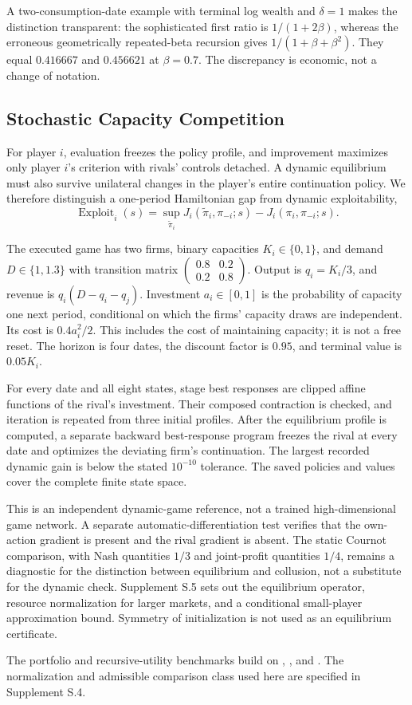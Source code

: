 A two-consumption-date example with terminal log wealth and $\delta=1$ makes the distinction transparent: the sophisticated first ratio is $1/(1+2\beta)$, whereas the erroneous geometrically repeated-beta recursion gives $1/(1+\beta+\beta^2)$. They equal $0.416667$ and $0.456621$ at $\beta=0.7$. The discrepancy is economic, not a change of notation.

\subsection{Stochastic Capacity Competition}
For player $i$, evaluation freezes the policy profile, and improvement maximizes only player $i$'s criterion with rivals' controls detached. A dynamic equilibrium must also survive unilateral changes in the player's entire continuation policy. We therefore distinguish a one-period Hamiltonian gap from dynamic exploitability,
\begin{equation}
 \operatorname{Exploit}_i(s)=\sup_{\widetilde\pi_i}
 J_i(\widetilde\pi_i,\pi_{-i};s)-J_i(\pi_i,\pi_{-i};s).
 \label{eq:exploit}
\end{equation}

The executed game has two firms, binary capacities $K_i\in\{0,1\}$, and demand $D\in\{1,1.3\}$ with transition matrix
$\left(\begin{smallmatrix}0.8&0.2\\0.2&0.8\end{smallmatrix}\right)$.
Output is $q_i=K_i/3$, and revenue is $q_i(D-q_i-q_j)$. Investment $a_i\in[0,1]$ is the probability of capacity one next period, conditional on which the firms' capacity draws are independent. Its cost is $0.4a_i^2/2$. This includes the cost of maintaining capacity; it is not a free reset. The horizon is four dates, the discount factor is $0.95$, and terminal value is $0.05K_i$.

For every date and all eight states, stage best responses are clipped affine functions of the rival's investment. Their composed contraction is checked, and iteration is repeated from three initial profiles. After the equilibrium profile is computed, a separate backward best-response program freezes the rival at every date and optimizes the deviating firm's continuation. The largest recorded dynamic gain is below the stated $10^{-10}$ tolerance. The saved policies and values cover the complete finite state space.

This is an independent dynamic-game reference, not a trained high-dimensional game network. A separate automatic-differentiation test verifies that the own-action gradient is present and the rival gradient is absent. The static Cournot comparison, with Nash quantities $1/3$ and joint-profit quantities $1/4$, remains a diagnostic for the distinction between equilibrium and collusion, not a substitute for the dynamic check. Supplement S.5 sets out the equilibrium operator, resource normalization for larger markets, and a conditional small-player approximation bound. Symmetry of initialization is not used as an equilibrium certificate.

The portfolio and recursive-utility benchmarks build on \citet{merton1971}, \citet{epstein1989}, and \citet{duffie1992}. The normalization and admissible comparison class used here are specified in Supplement S.4.
